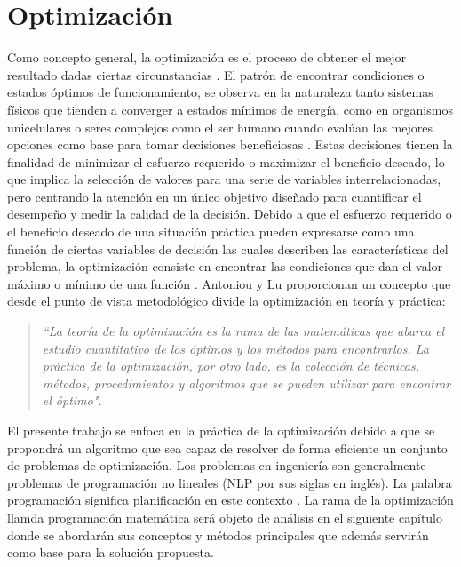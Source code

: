 
\chapter{Optimización} %

\label{Chapter2} %

Como concepto general, la optimización es el proceso de obtener el mejor resultado dadas ciertas circunstancias \cite{rao_engineering_2009}. El patrón de encontrar condiciones o estados óptimos de funcionamiento, se observa en la naturaleza tanto  sistemas físicos que tienden a converger a estados mínimos de energía, como en organismos unicelulares o seres complejos como el ser humano cuando evalúan las mejores opciones como base para tomar decisiones beneficiosas \cite{nocedal2006numerical}. Estas decisiones tienen la finalidad de minimizar el esfuerzo requerido o maximizar el beneficio deseado, lo que implica la selección de valores para una serie de variables interrelacionadas, pero centrando la atención en un único objetivo diseñado para cuantificar el desempeño y medir la calidad de la decisión. Debido a que el esfuerzo requerido o el beneficio deseado de una situación práctica pueden expresarse como una función de ciertas variables de decisión las cuales describen las características del problema, la optimización consiste en encontrar las condiciones que dan el valor máximo o mínimo de una función \cite{rao_engineering_2009}. Antoniou y Lu \cite{antoniou_practical_2007} proporcionan un concepto que desde el punto de vista metodológico divide la optimización en teoría y práctica:

\begin{quote}
\textit{``La teoría de la optimización es la rama de las matemáticas que abarca el estudio cuantitativo de los óptimos y los métodos para encontrarlos. La práctica de la optimización, por otro lado, es la colección de técnicas, métodos, procedimientos y algoritmos que se pueden utilizar para encontrar el óptimo".}
\end{quote}
El presente trabajo se enfoca en la práctica de la optimización debido a que se propondrá un algoritmo que sea capaz de resolver de forma eficiente un conjunto de problemas de optimización. Los problemas en ingeniería son generalmente problemas de programación no lineales (NLP por sus siglas en inglés). La palabra programación significa planificación en este contexto \cite{belegundu_optimization_2011}. La rama de la optimización llamda programación matemática será objeto de análisis en el siguiente capítulo donde se abordarán sus conceptos y métodos principales que además servirán como base para la solución propuesta. 

